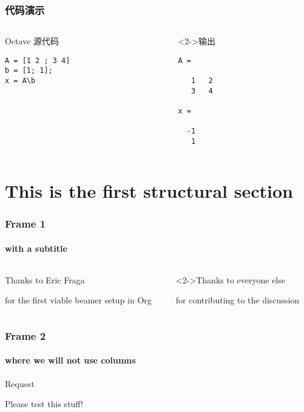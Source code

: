 \documentclass[bigger]{beamer}
\begin{document}
\begin{frame}[fragile,t]
\frametitle{代码演示}
\label{sec-5-3}
\begin{columns}
\begin{column}{0.45\textwidth}
\begin{block}{Octave 源代码}
\label{sec-5-3-1}


\begin{verbatim}
A = [1 2 ; 3 4]
b = [1; 1];
x = A\b
\end{verbatim}
\end{block}
\end{column}
\begin{column}{0.4\textwidth}
\begin{block}<2->{输出}
\label{sec-5-3-2}



\begin{verbatim}
A =

   1   2
   3   4

x =

  -1
   1
\end{verbatim}
\end{block}
\end{column}
\end{columns}
\end{frame}
\section{This is the first structural section}
\label{sec-6}

     
\begin{frame}
\frametitle{Frame 1}
\framesubtitle{with a subtitle}
\label{sec-6-1}
\begin{columns}[t]
\begin{column}{0.5\textwidth}
\begin{block}{Thanks to Eric Fraga}
\label{sec-6-1-1}

    for the first viable beamer setup in Org
\end{block}
\end{column}
\begin{column}{0.5\textwidth}
\begin{block}<2->{Thanks to everyone else}
\label{sec-6-1-2}

    for contributing to the discussion
\end{block}
\end{column}
\end{columns}
\end{frame}
\begin{frame}
\frametitle{Frame 2}
\framesubtitle{where we will not use columns}
\label{sec-6-2}
\begin{block}{Request}
\label{sec-6-2-1}

    Please test this stuff!
\end{block}
\end{frame}
\end{document}
